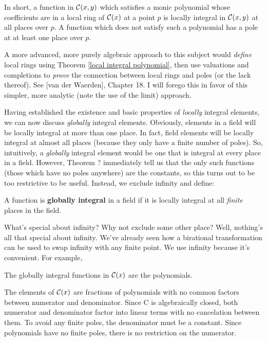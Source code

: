 \endtheorem

In short, a function in ${\cal C}(x,y)$ which satisfies a monic
polynomial whose coefficients are in a local ring of ${\cal C}(x)$ at
a point $p$ is locally integral in ${\cal C}(x,y)$ at all places over
$p$.  A function which does not satisfy such a polynomial has
a pole at at least one place over $p$.

A more advanced, more purely algebraic approach to this subject would
{\it define} local rings using Theorem \ref{local integral
polynomial}, then use valuations and completions to {\it prove} the
connection between local rings and poles (or the lack thereof).  See
[van der Waerden], Chapter 18.  I will forego this in favor of this
simpler, more analytic (note the use of the limit) approach.


Having established the existence and basic properties of {\it locally}
integral elements, we can now discuss {\it globally} integral
elements.  Obviously, elements in a field will be locally integral at
more than one place.  In fact, field elements will be locally integral
at almost all places (because they only have a finite number of
poles).  So, intuitively, a {\it globally} integral element would be
one that is integral at every place in a field.  However, Theorem ?
immediately tell us that the only such functions (those which have no
poles anywhere) are the constants, so this turns out to be too
restrictive to be useful.  Instead, we exclude infinity and define:


A function is {\bf globally integral} in a field if it is locally
integral at all {\it finite} places in the field.

\enddefinition

What's special about infinity?  Why not exclude some other place?
Well, nothing's all that special about infinity.  We've already seen
how a birational transformation can be used to swap infinity with any
finite point.  We use infinity because it's convenient.  For example,

\theorem

The globally integral functions in ${\cal C}(x)$ are the polynomials.

\proof

The elements of ${\cal C}(x)$ are fractions of polynomials with no
common factors between numerator and denominator.  Since {\cal C} is
algebraically closed, both numerator and denominator factor into
linear terms with no cancelation between them.  To avoid any finite
poles, the denominator must be a constant.  Since polynomials
have no finite poles, there is no restriction on the numerator.

